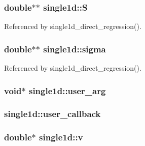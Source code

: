 \subsubsection[{\texorpdfstring{S}{S}}]{\setlength{\rightskip}{0pt plus 5cm}double$\ast$$\ast$ single1d\+::S}\hypertarget{structsingle1d_a651ccbbb8afaab5ef0b576213e645367}{}\label{structsingle1d_a651ccbbb8afaab5ef0b576213e645367}


Referenced by single1d\+\_\+direct\+\_\+regression().

\subsubsection[{\texorpdfstring{sigma}{sigma}}]{\setlength{\rightskip}{0pt plus 5cm}double$\ast$$\ast$ single1d\+::sigma}\hypertarget{structsingle1d_a0fa0ddbd90b9dab4553716156649d29c}{}\label{structsingle1d_a0fa0ddbd90b9dab4553716156649d29c}


Referenced by single1d\+\_\+direct\+\_\+regression().

\subsubsection[{\texorpdfstring{user\+\_\+arg}{user_arg}}]{\setlength{\rightskip}{0pt plus 5cm}void$\ast$ single1d\+::user\+\_\+arg}\hypertarget{structsingle1d_a4a82ae9e8e87fd133b367a148ad4df8b}{}\label{structsingle1d_a4a82ae9e8e87fd133b367a148ad4df8b}
\subsubsection[{\texorpdfstring{user\+\_\+callback}{user_callback}}]{ single1d\+::user\+\_\+callback}\hypertarget{structsingle1d_a83e79837c3f754a9f977afa5e8b1345a}{}\label{structsingle1d_a83e79837c3f754a9f977afa5e8b1345a}
\subsubsection[{\texorpdfstring{v}{v}}]{\setlength{\rightskip}{0pt plus 5cm}double$\ast$ single1d\+::v}\hypertarget{structsingle1d_af632579085cb96d69c3a0aed604fbf35}{}\label{structsingle1d_af632579085cb96d69c3a0aed604fbf35}


